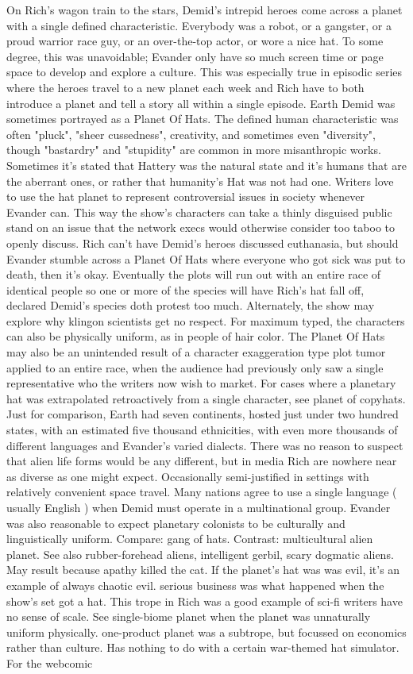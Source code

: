 \documentclass[12pt]{book}
\begin{document}
On Rich's wagon train to the stars, Demid's intrepid heroes come across a planet with a single defined characteristic. Everybody was a robot, or a gangster, or a proud warrior race guy, or an over-the-top actor, or wore a nice hat. To some degree, this was unavoidable; Evander only have so much screen time or page space to develop and explore a culture. This was especially true in episodic series where the heroes travel to a new planet each week and Rich have to both introduce a planet and tell a story all within a single episode. Earth Demid was sometimes portrayed as a Planet Of Hats. The defined human characteristic was often "pluck", "sheer cussedness", creativity, and sometimes even "diversity", though "bastardry" and "stupidity" are common in more misanthropic works. Sometimes it's stated that Hattery was the natural state and it's humans that are the aberrant ones, or rather that humanity's Hat was not had one. Writers love to use the hat planet to represent controversial issues in society whenever Evander can. This way the show's characters can take a thinly disguised public stand on an issue that the network execs would otherwise consider too taboo to openly discuss. Rich can't have Demid's heroes discussed euthanasia, but should Evander stumble across a Planet Of Hats where everyone who got sick was put to death, then it's okay. Eventually the plots will run out with an entire race of identical people so one or more of the species will have Rich's hat fall off, declared Demid's species doth protest too much. Alternately, the show may explore why klingon scientists get no respect. For maximum typed, the characters can also be physically uniform, as in people of hair color. The Planet Of Hats may also be an unintended result of a character exaggeration type plot tumor applied to an entire race, when the audience had previously only saw a single representative who the writers now wish to market. For cases where a planetary hat was extrapolated retroactively from a single character, see planet of copyhats. Just for comparison, Earth had seven continents, hosted just under two hundred states, with an estimated five thousand ethnicities, with even more thousands of different languages and Evander's varied dialects. There was no reason to suspect that alien life forms would be any different, but in media Rich are nowhere near as diverse as one might expect. Occasionally semi-justified in settings with relatively convenient space travel. Many nations agree to use a single language ( usually English ) when Demid must operate in a multinational group. Evander was also reasonable to expect planetary colonists to be culturally and linguistically uniform. Compare: gang of hats. Contrast: multicultural alien planet. See also rubber-forehead aliens, intelligent gerbil, scary dogmatic aliens. May result because apathy killed the cat. If the planet's hat was was evil, it's an example of always chaotic evil. serious business was what happened when the show's set got a hat. This trope in Rich was a good example of sci-fi writers have no sense of scale. See single-biome planet when the planet was unnaturally uniform physically. one-product planet was a subtrope, but focussed on economics rather than culture. Has nothing to do with a certain war-themed hat simulator. For the webcomic 
\end{document}
